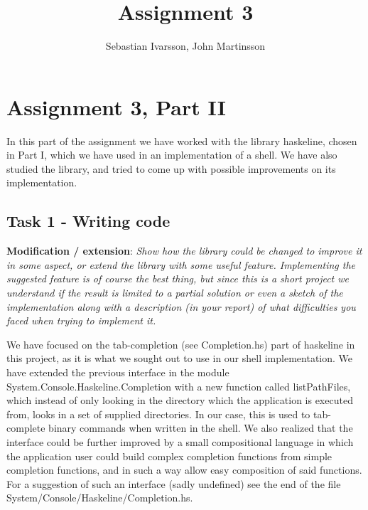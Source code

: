 \documentclass[11pt,a4paper]{article}
\begin{document}
\pagestyle{fancy}

\renewcommand{\headrulewidth}{0pt} \setlength{\headsep}{30pt}
\setlength{\headheight}{30pt}

\title{Assignment 3}
\author{Sebastian Ivarsson, John Martinsson}
\maketitle
\thispagestyle{fancy}


%


\section{Assignment 3, Part II}
In this part of the assignment we have worked with the library haskeline, chosen
in Part I, which we have used in an implementation of a shell. We have also
studied the library, and tried to come up with possible improvements on its
implementation.

\subsection{Task 1 - Writing code}

\textbf{Modification / extension}: \textit{Show how the library could be changed to improve it in
some aspect, or extend the library with some useful feature. Implementing the
suggested feature is of course the best thing, but since this is a short project
we understand if the result is limited to a partial solution or even a sketch of
the implementation along with a description (in your report) of what
difficulties you faced when trying to implement it.}

We have focused on the tab-completion (see Completion.hs) part of haskeline in
this project, as it is what we sought out to use in our shell implementation. We
have extended the previous interface in the module
System.Console.Haskeline.Completion with a new function called listPathFiles,
which instead of only looking in the directory which the application is executed
from, looks in a set of supplied directories. In our case, this is used to
tab-complete binary commands when written in the shell. We also realized that
the interface could be further improved by a small compositional language in
which the application user could build complex completion functions from simple
completion functions, and in such a way allow easy composition of said
functions. For a suggestion of such an interface (sadly undefined) see the end
of the file System/Console/Haskeline/Completion.hs.
\end{document}
